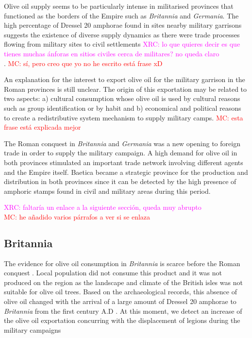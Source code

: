 \documentclass[review]{elsarticle}
\newcommand{\memo}[2]{\textcolor{#1}{#2}}
\newcommand{\maria}[1]{\memo{red}{MC: #1\\}}
\newcommand{\xavi}[1]{\memo{magenta}{XRC: #1\\}}
\begin{document}
Olive oil supply seems to be particularly intense in militarised provinces that functioned as the borders of the Empire such as \textit{Britannia} and \textit{Germania}. The high percentage of Dressel 20 amphorae found in sites nearby military garrisons suggests the existence of diverse supply dynamics as there were trade processes flowing from military sites to civil settlements\citep{remesal_annona_1986, carreras_britannia_1998}
\xavi{lo que quieres decir es que tienes muchas ánforas en sitios civiles cerca de militares? no queda claro}.
\maria{sí, pero creo que yo no he escrito está frase xD}

An explanation for the interest to export olive oil for the military garrison in the Roman provinces is still unclear. The origin of this exportation may be related to two aspects: a) cultural consumption whose olive oil is used by cultural reasons such as group identification or by habit and b) economical and political reasons to create a redistributive system mechanism to supply military camps. 
\maria{esta frase está explicada mejor}


The Roman conquest in \textit{Britannia} and \textit{Germania} was a new opening to foreign trade in order to supply the military campaign. A high demand for olive oil in both provinces stimulated an important trade network involving different agents and the Empire itself. Baetica became a strategic province for the production and distribution in both provinces since it can be detected by the high presence of amphoric stamps found in civil and military areas during this period. 

\xavi{faltaría un enlace a la siguiente sección, queda muy abrupto}
\maria{he añadido varios párrafos a ver si se enlaza}


\subsection{Britannia}

The evidence for olive oil consumption in \textit{Britannia} is scarce before the Roman conquest \citep{funari_corpus_1996,carreras_abastecimiento_2003}. Local population did not consume this product and it was not produced on the region as the landscape and climate of the British isles was not suitable for olive oil trees\citep[161]{monfort_britanniaen_1998}. Based on the archaeological records, this absence of olive oil changed with the arrival of a large amount of Dressel 20 amphorae to \textit{Britannia} from the first century A.D \citep{peacock_amphorae_1991,
carreras_britannia_1998}. At this moment, we detect an increase of the olive oil exportation concurring with the displacement of legions during the military campaigns \citep[161]{monfort_britanniaen_1998}
\end{document}

